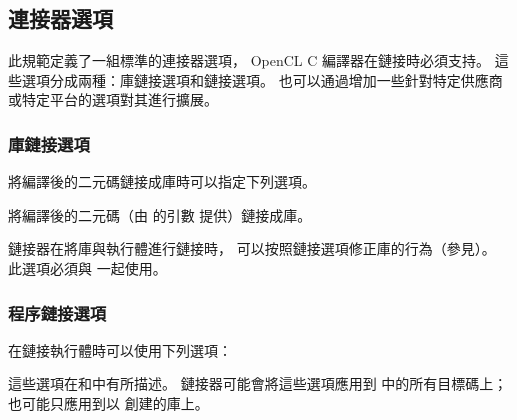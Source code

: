 \subsection[sec:linkOption]{連接器選項}

此規範定義了一組標準的連接器選項， OpenCL C 編譯器在鏈接時必須支持。
這些選項分成兩種：庫鏈接選項和鏈接選項。
也可以通過增加一些針對特定供應商或特定平台的選項對其進行擴展。

\subsubsection{庫鏈接選項}

將編譯後的二元碼鏈接成庫時可以指定下列選項。

將編譯後的二元碼（由  的引數  提供）鏈接成庫。
\stopclOption

鏈接器在將庫與執行體進行鏈接時，
可以按照鏈接選項修正庫的行為（參見）。
此選項必須與  一起使用。
\stopclOption

\subsubsection[sec:programLinkOption]{程序鏈接選項}

在鏈接執行體時可以使用下列選項：
\startigBase
\item {}
\item {}
\item {}
\item {}
\item {}
\stopigBase

這些選項在和中有所描述。
鏈接器可能會將這些選項應用到  中的所有目標碼上；
也可能只應用到以  創建的庫上。
